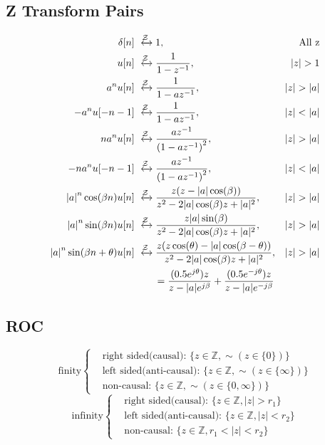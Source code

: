 \subsection{Z Transform Pairs}
\begin{align*}
    \delta [n] &\xleftrightarrow{\mathcal{Z}} 1, &\text{All z}\\
    u[n] &\xleftrightarrow{\mathcal{Z}} \frac{1}{{1 - z^{-1}}},&\left| z \right| > 1\\
    a^n u[n] &\xleftrightarrow{\mathcal{Z}} \frac{1}{1 - az^{-1}},&\left| z \right| > \left| a \right|\\
    -a^n u[-n-1] &\xleftrightarrow{\mathcal{Z}} \frac{1}{1 - az^{-1}},&\left| z \right| < \left| a \right|\\
    na^n u[n] &\xleftrightarrow{\mathcal{Z}} \frac{{az^{-1}}}{{\left( {1 - az^{-1}} \right)^2 }},&\left| z \right| > \left| a \right|\\
    -na^n u[-n-1] &\xleftrightarrow{\mathcal{Z}} \frac{{az^{-1}}}{{\left( {1 - az^{-1}} \right)^2 }},&\left| z \right| < \left| a \right|\\
    \left|a\right|^n\cos (\beta n)u[n] &\xleftrightarrow{\mathcal{Z}} \frac{z(z-\left|a\right|\cos (\beta))}{z^2-2|a|\cos(\beta)z+|a|^2}, &|z|>|a|\\
    \left|a\right|^n\sin (\beta n)u[n] &\xleftrightarrow{\mathcal{Z}} \frac{z|a|\sin(\beta)}{z^2-2|a|\cos(\beta)z+|a|^2}, &|z|>|a|\\
    \left|a\right|^n\sin (\beta n + \theta)u[n] &\xleftrightarrow{\mathcal{Z}} \frac{z(z\cos(\theta)-|a|\cos(\beta-\theta))}{z^2-2|a|\cos(\beta)z+|a|^2}, &|z|>|a|\\
    &\qquad=\frac{(0.5e^{j\theta})z}{z-|a|e^{j\beta}}+\frac{(0.5e^{-j\theta})z}{z-|a|e^{-j\beta}}
\end{align*}
\subsection{ROC}
\begin{equation*}
    \text{finity}
        \begin{cases}
            & \text{right sided(causal): } \{z \in \mathbb{Z}, \sim(z\in \{0\})\}\\
            & \text{left sided(anti-causal): } \{z\in \mathbb{Z}, \sim(z\in\{\infty\})\}\\
            & \text{non-causal: } \{z\in \mathbb{Z}, \sim(z\in\{0, \infty\})\}
        \end{cases}
\end{equation*}
\begin{equation*}
    \text{infinity}
        \begin{cases}
            & \text{right sided(causal): } \{z \in \mathbb{Z}, |z| > r_1\}\\
            & \text{left sided(anti-causal): } \{z \in \mathbb{Z}, |z| < r_2\}\\
            & \text{non-causal: } \{z \in \mathbb{Z}, r_1 < |z| < r_2\}
        \end{cases}
\end{equation*}